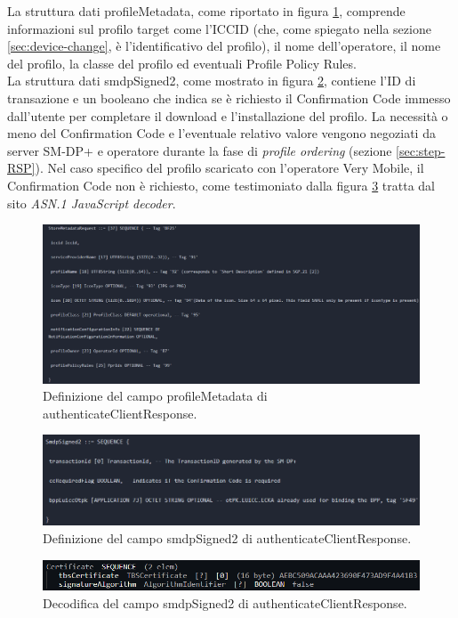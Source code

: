 \documentclass[10pt, oneside]{book}
\begin{document}
La struttura dati profileMetadata, come riportato in figura \ref{fig:def-profileMetadata}, comprende informazioni sul profilo target come l'ICCID (che, come spiegato nella sezione \ref{sec:device-change}, è l'identificativo del profilo), il nome dell'operatore, il nome del profilo, la classe del profilo ed eventuali Profile Policy Rules.\\

La struttura dati smdpSigned2, come mostrato in figura \ref{fig:def-smdpSigned2}, contiene l'ID di transazione e un booleano che indica se è richiesto il Confirmation Code immesso dall'utente per completare il download e l'installazione del profilo. La necessità o meno del Confirmation Code e l'eventuale relativo valore vengono negoziati da server SM-DP+ e operatore durante la fase di \textit{profile ordering} (sezione \ref{sec:step-RSP}). Nel caso specifico del profilo scaricato con l'operatore Very Mobile, il Confirmation Code non è richiesto, come testimoniato dalla figura \ref{fig:decode-smdpSigned2} tratta dal sito \textit{ASN.1 JavaScript decoder}.\\
\begin{figure}
\includegraphics[width=\linewidth]{def-profileMetadata.png}
\caption{Definizione del campo profileMetadata di authenticateClientResponse.}
\label{fig:def-profileMetadata}
\end{figure}
\begin{figure}
\includegraphics[width=\linewidth]{def-smdpSigned2.png}
\caption{Definizione del campo smdpSigned2 di authenticateClientResponse.}
\label{fig:def-smdpSigned2}
\end{figure}
\begin{figure}
\includegraphics[width=\linewidth]{decode-smdpSigned2.png}
\caption{Decodifica del campo smdpSigned2 di authenticateClientResponse.}
\label{fig:decode-smdpSigned2}
\end{figure}
\end{document}
